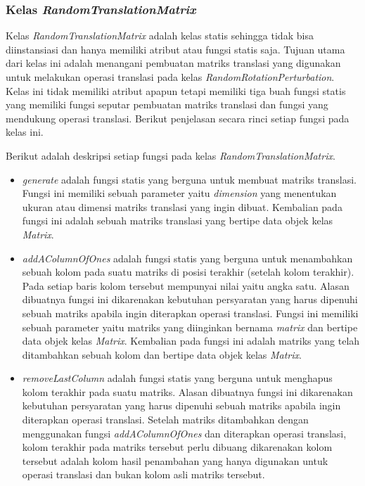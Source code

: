\subsubsection{Kelas \textit{RandomTranslationMatrix}}
\label{subsubsec:kelas-rtm}

Kelas \textit{RandomTranslationMatrix} adalah kelas statis sehingga tidak bisa diinstansiasi dan hanya memiliki atribut atau fungsi statis saja. Tujuan utama dari kelas ini adalah menangani pembuatan matriks translasi yang digunakan untuk melakukan operasi translasi pada kelas \textit{RandomRotationPerturbation}. Kelas ini tidak memiliki atribut apapun tetapi memiliki tiga buah fungsi statis yang memiliki fungsi seputar pembuatan matriks translasi dan fungsi yang mendukung operasi translasi. Berikut penjelasan secara rinci setiap fungsi pada kelas ini.

Berikut adalah deskripsi setiap fungsi pada kelas \textit{RandomTranslationMatrix}.
\begin{itemize}
	\item \textit{generate} adalah fungsi statis yang berguna untuk membuat matriks translasi. Fungsi ini memiliki sebuah parameter yaitu \textit{dimension} yang menentukan ukuran atau dimensi matriks translasi yang ingin dibuat. Kembalian pada fungsi ini adalah sebuah matriks translasi yang bertipe data objek kelas \textit{Matrix}.
	\item \textit{addAColumnOfOnes} adalah fungsi statis yang berguna untuk menambahkan sebuah kolom pada suatu matriks di posisi terakhir (setelah kolom terakhir). Pada setiap baris kolom tersebut mempunyai nilai yaitu angka satu. Alasan dibuatnya fungsi ini dikarenakan kebutuhan persyaratan yang harus dipenuhi sebuah matriks apabila ingin diterapkan operasi translasi. Fungsi ini memiliki sebuah parameter yaitu matriks yang diinginkan bernama \textit{matrix} dan bertipe data objek kelas \textit{Matrix}. Kembalian pada fungsi ini adalah matriks yang telah ditambahkan sebuah kolom dan bertipe data objek kelas \textit{Matrix}.
	\item \textit{removeLastColumn} adalah fungsi statis yang berguna untuk menghapus kolom terakhir pada suatu matriks. Alasan dibuatnya fungsi ini dikarenakan kebutuhan persyaratan yang harus dipenuhi sebuah matriks apabila ingin diterapkan operasi translasi. Setelah matriks ditambahkan dengan menggunakan fungsi \textit{addAColumnOfOnes} dan diterapkan operasi translasi, kolom terakhir pada matriks tersebut perlu dibuang dikarenakan kolom tersebut adalah kolom hasil penambahan yang hanya digunakan untuk operasi translasi dan bukan kolom asli matriks tersebut.
\end{itemize}

